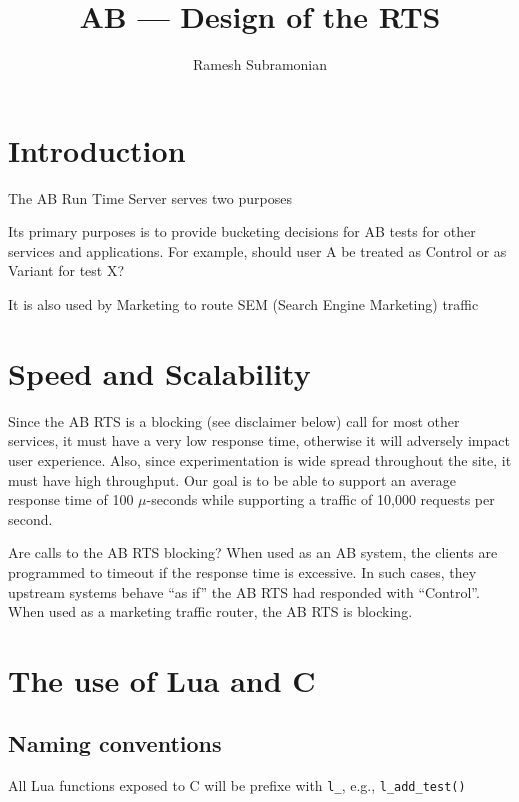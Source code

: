 \documentclass[letterpaper]{article}
\begin{document}
\title{AB --- Design of the RTS}
\author{ Ramesh Subramonian }
\maketitle
\thispagestyle{fancy}
\lhead{}
\chead{}
\rhead{}
\cfoot{}
\rfoot{{\small \thepage}}

\section{Introduction}

The AB Run Time Server serves two purposes 
\be
\item Its primary purposes is to provide bucketing decisions for AB tests for
  other services and applications. For example, should user A be treated as
  Control or as Variant for test X? 
\item It is also used by Marketing to route SEM (Search Engine Marketing)
  traffic 
  \ee

\section{Speed and Scalability}

Since the AB RTS is a blocking (see disclaimer below) call for most other
services, it must have a very low response time, otherwise it will adversely
impact user experience. Also, since experimentation is
wide spread throughout the site, it must have high throughput.
Our goal is to be able to support an average response time of 100
\(\mu\)-seconds while supporting a traffic of 10,000 requests per second.

Are calls to the AB RTS blocking? When used as an AB system, the clients are
programmed to timeout if the response time is excessive. In such cases, they
upstream systems behave ``as if'' the AB RTS had responded with ``Control''.
When used as a marketing traffic router, the AB RTS is blocking.

\section{The use of Lua and C}

\subsection{Naming conventions}

All Lua functions exposed to C will be prefixe with \verb+l_+, e.g.,
\verb+l_add_test()+
\end{document}
